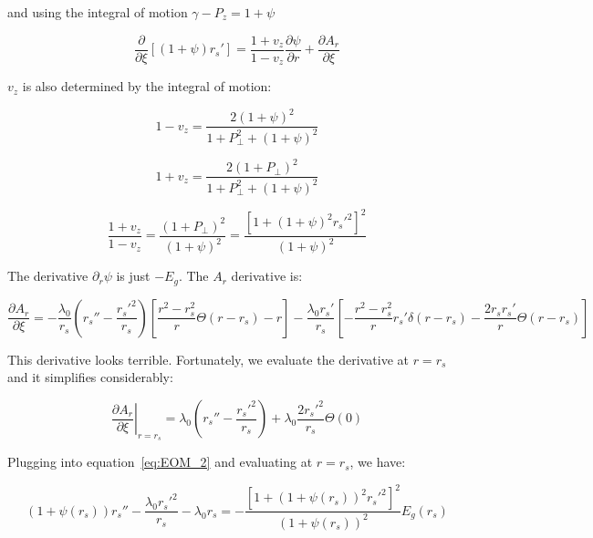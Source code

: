 \documentclass[aps,prl,preprint,groupedaddress]{revtex4-1}
\begin{document}
and using the integral of motion $\gamma - P_z = 1 + \psi$

\begin{equation}\label{eq:EOM_2}
\frac{\partial}{\partial \xi}[(1+\psi)r_s'] = \frac{1+v_z}{1-v_z}\frac{\partial \psi}{\partial r} + \frac{\partial A_r}{\partial \xi}
\end{equation}

$v_z$ is also determined by the integral of motion:

\begin{equation}\label{eq:v_z1}
1-v_z = \frac{2(1+\psi)^2}{1+P_\perp^2 + (1+\psi)^2}
\end{equation}

\begin{equation}\label{eq:v_z2}
1+v_z = \frac{2(1+P_\perp)^2}{1+P_\perp^2 + (1+\psi)^2}
\end{equation}

\begin{equation}\label{eq:v_z3}
\frac{1+v_z}{1-v_z} = \frac{(1+P_\perp)^2}{(1+\psi)^2} = \frac{\left[1+(1+\psi)^2r_s'^2\right]^2}{(1+\psi)^2}
\end{equation}

The derivative $\partial_r \psi$ is just $-E_g$. The $A_r$ derivative is:


\begin{equation}\label{dA_r}
\frac{\partial A_r}{\partial \xi} = -\frac{\lambda_0}{r_s}\left(r_s''-\frac{r_s'^2}{r_s}\right)\left[\frac{r^2-r_s^2}{r}\Theta(r-r_s)-r\right] - \frac{\lambda_0 r_s'}{r_s}\left[-\frac{r^2 -r_s^2}{r}r_s'\delta(r-r_s)-\frac{2 r_s r_s'}{r}\Theta(r-r_s)\right]
\end{equation}

This derivative looks terrible. Fortunately, we evaluate the derivative at $r=r_s$ and it simplifies considerably:

\begin{equation}\label{dA_r}
\left. \frac{\partial A_r}{\partial \xi}\right|_{r=r_s} = \lambda_0\left(r_s''-\frac{r_s'^2}{r_s}\right) + \lambda_0 \frac{2 r_s'^2}{r_s}\Theta(0)
\end{equation}

Plugging into equation~\ref{eq:EOM_2} and evaluating at $r=r_s$, we have:

\begin{equation}\label{eq:rs_grrrr}
\left(1+\psi(r_s)\right)r_s'' - \frac{\lambda_0 r_s'^2}{r_s} - \lambda_0 r_s = -\frac{\left[1+(1+\psi(r_s))^2r_s'^2\right]^2}{(1+\psi(r_s))^2}E_g(r_s)
\end{equation}
\end{document}
